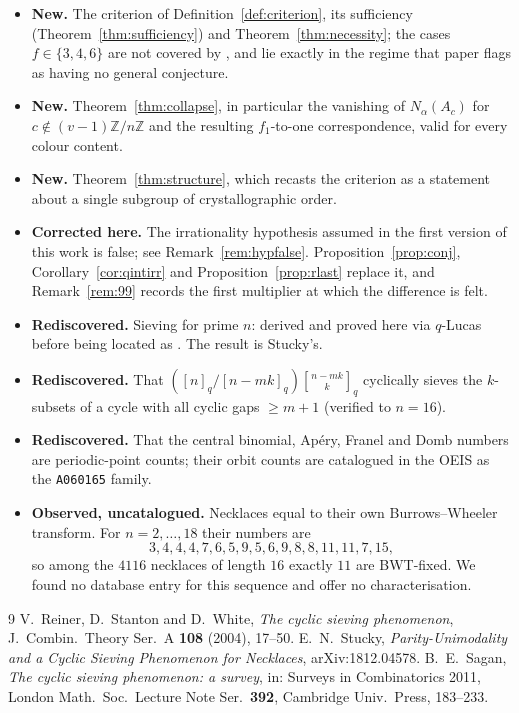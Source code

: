 \documentclass[11pt,a4paper]{article}
\theoremstyle{plain}
\theoremstyle{definition}
\theoremstyle{remark}
\newcommand{\Z}{\mathbb{Z}}
\newcommand{\Zn}{\Z/n\Z}
\newcommand{\qint}[1]{[#1]_q}
\newcommand{\qbin}[2]{\genfrac[]{0pt}{}{#1}{#2}_{q}}
\begin{document}
\begin{itemize}
  \item \textbf{New.} The criterion of Definition~\ref{def:criterion}, its sufficiency
        (Theorem~\ref{thm:sufficiency}) and Theorem~\ref{thm:necessity}; the cases
        $f\in\{3,4,6\}$ are not covered by \cite{stucky}, and lie exactly in the regime that
        paper flags as having no general conjecture.
  \item \textbf{New.} Theorem~\ref{thm:collapse}, in particular the vanishing of
        $N_\alpha(A_c)$ for $c\notin(v-1)\Zn$ and the resulting $f_1$-to-one correspondence,
        valid for every colour content.
  \item \textbf{New.} Theorem~\ref{thm:structure}, which recasts the criterion as a
        statement about a single subgroup of crystallographic order.
  \item \textbf{Corrected here.} The irrationality hypothesis assumed in the first version of
        this work is false; see Remark~\ref{rem:hypfalse}. Proposition~\ref{prop:conj},
        Corollary~\ref{cor:qintirr} and Proposition~\ref{prop:rlast} replace it, and
        Remark~\ref{rem:99} records the first multiplier at which the difference is felt.
  \item \textbf{Rediscovered.} Sieving for prime $n$: derived and proved here via $q$-Lucas
        before being located as \cite[Cor.~3.3]{stucky}. The result is Stucky's.
  \item \textbf{Rediscovered.} That
        $(\qint{n}/\qint{n-mk})\qbin{n-mk}{k}$ cyclically sieves the $k$-subsets of a cycle
        with all cyclic gaps $\ge m+1$ (verified to $n=16$).
  \item \textbf{Rediscovered.} That the central binomial, Ap\'ery, Franel and Domb numbers
        are periodic-point counts; their orbit counts are catalogued in the OEIS as the
        \texttt{A060165} family.
  \item \textbf{Observed, uncatalogued.} Necklaces equal to their own Burrows--Wheeler
        transform. For $n=2,\dots,18$ their numbers are
        \[3,4,4,4,7,6,5,9,5,6,9,8,8,11,11,7,15,\]
        so among the $4116$ necklaces of length $16$ exactly $11$ are BWT-fixed. We found no
        database entry for this sequence and offer no characterisation.
\end{itemize}

\begin{thebibliography}{9}
 V.~Reiner, D.~Stanton and D.~White,
  \emph{The cyclic sieving phenomenon},
  J.\ Combin.\ Theory Ser.\ A \textbf{108} (2004), 17--50.
 E.~N.~Stucky,
  \emph{Parity-Unimodality and a Cyclic Sieving Phenomenon for Necklaces},
  arXiv:1812.04578.
 B.~E.~Sagan,
  \emph{The cyclic sieving phenomenon: a survey},
  in: Surveys in Combinatorics 2011, London Math.\ Soc.\ Lecture Note Ser.\ \textbf{392},
  Cambridge Univ.\ Press, 183--233.
\end{thebibliography}
\end{document}
